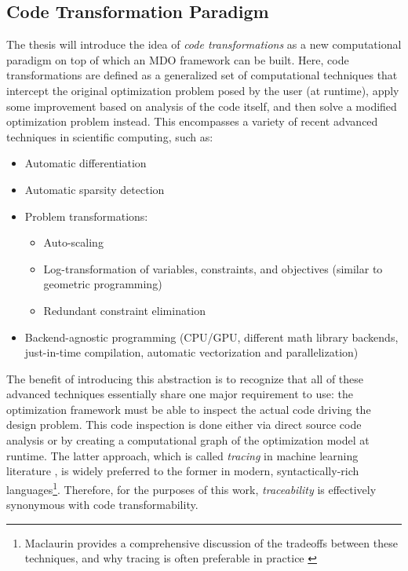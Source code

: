 \documentclass[12pt,vi,oneside]{report}
\begin{document}
    \subsection{Code Transformation Paradigm}

    The thesis will introduce the idea of \textit{code transformations} as a new computational paradigm on top of which an MDO framework can be built. Here, code transformations are defined as a generalized set of computational techniques that intercept the original optimization problem posed by the user (at runtime), apply some improvement based on analysis of the code itself, and then solve a modified optimization problem instead. This encompasses a variety of recent advanced techniques in scientific computing, such as:
    \begin{itemize}[noitemsep]
        \item Automatic differentiation \cite{griewank_automatic_1988}
        \item Automatic sparsity detection \cite{gebremedhin_efficient_2009}
        \item Problem transformations:
        \begin{itemize}[noitemsep]
            \item Auto-scaling \cite{nocedal_numerical_2006}
            \item Log-transformation of variables, constraints, and objectives (similar to geometric programming) \cite{kirschen, agrawal_disciplined_2019}
            \item Redundant constraint elimination
        \end{itemize}
        \item Backend-agnostic programming (CPU/GPU, different math library backends, just-in-time compilation, automatic vectorization and parallelization) \cite{jax}
    \end{itemize}

    The benefit of introducing this abstraction is to recognize that all of these advanced techniques essentially share one major requirement to use: the optimization framework must be able to inspect the actual code driving the design problem. This code inspection is done either via direct source code analysis or by creating a computational graph of the optimization model at runtime. The latter approach, which is called \textit{tracing} in machine learning literature \cite{jax, frostig_compiling_2018, baydin_automatic_2018}, is widely preferred to the former in modern, syntactically-rich languages\footnote{Maclaurin provides a comprehensive discussion of the tradeoffs between these techniques, and why tracing is often preferable in practice \cite{maclaurin_modeling_2016}}. Therefore, for the purposes of this work, \textit{traceability} is effectively synonymous with code transformability.
\end{document}
